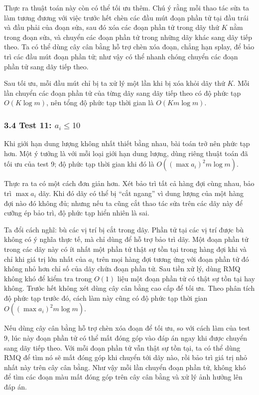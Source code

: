 \documentclass[11pt]{article}
\begin{document}
Thực ra thuật toán này còn có thể tối ưu thêm. Chú ý rằng mỗi thao tác sửa ta
làm tương đương với việc trước hết chèn các đầu mút đoạn phần tử tại đầu trái và
đầu phải của đoạn sửa, sau đó xóa các đoạn phần tử trong dãy thứ \(K\) nằm trong
đoạn sửa, và chuyển các đoạn phần tử trong những dãy khác sang dãy tiếp theo. Ta
có thể dùng cây cân bằng hỗ trợ chèn xóa đoạn, chẳng hạn splay, để bảo trì các
đầu mút đoạn phần tử; như vậy có thể nhanh chóng chuyển các đoạn phần tử sang
dãy tiếp theo.

Sau tối ưu, mỗi đầu mút chỉ bị ta xử lý một lần khi bị xóa khỏi dãy thứ \(K\).
Mỗi lần chuyển các đoạn phần tử của từng dãy sang dãy tiếp theo có độ phức tạp
\(O(K\log m)\), nên tổng độ phức tạp thời gian là \(O(Km\log m)\).

\subsubsection*{3.4 Test 11: \(a_i\le 10\)}

Khi giới hạn dung lượng không nhất thiết bằng nhau, bài toán trở nên phức tạp
hơn. Một ý tưởng là với mỗi loại giới hạn dung lượng, dùng riêng thuật toán đã
tối ưu của test 9; độ phức tạp thời gian khi đó là
\(O((\max a_i)^2m\log m)\).

Thực ra ta có một cách đơn giản hơn. Xét bảo trì tất cả hàng đợi cùng nhau, bảo
trì \(\max a_i\) dãy. Khi đó dãy có thể bị ``cắt ngang'' vì dung lượng của một
hàng đợi nào đó không đủ; nhưng nếu ta cũng cắt thao tác sửa trên các dãy này để
cưỡng ép bảo trì, độ phức tạp hiển nhiên là sai.

Ta đổi cách nghĩ: bù các vị trí bị cắt trong dãy. Phần tử tại các vị trí được bù
không có ý nghĩa thực tế, mà chỉ dùng để hỗ trợ bảo trì dãy. Một đoạn phần tử
trong các dãy này có ít nhất một phần tử thật sự tồn tại trong hàng đợi khi và
chỉ khi giá trị lớn nhất của \(a_i\) trên mọi hàng đợi tương ứng với đoạn phần
tử đó không nhỏ hơn chỉ số của dãy chứa đoạn phần tử. Sau tiền xử lý, dùng RMQ
không khó để kiểm tra trong \(O(1)\) liệu một đoạn phần tử có thật sự tồn tại
hay không. Trước hết không xét dùng cây cân bằng cao cấp để tối ưu. Theo phân
tích độ phức tạp trước đó, cách làm này cũng có độ phức tạp thời gian
\(O((\max a_i)^2m\log m)\).

Nếu dùng cây cân bằng hỗ trợ chèn xóa đoạn để tối ưu, so với cách làm của test
9, lúc này đoạn phần tử có thể mất đóng góp vào đáp án ngay khi được chuyển sang
dãy tiếp theo. Với mỗi đoạn phần tử vẫn thật sự tồn tại, ta có thể dùng RMQ để
tìm nó sẽ mất đóng góp khi chuyển tới dãy nào, rồi bảo trì giá trị nhỏ nhất này
trên cây cân bằng. Như vậy mỗi lần chuyển đoạn phần tử, không khó để tìm các
đoạn màu mất đóng góp trên cây cân bằng và xử lý ảnh hưởng lên đáp án.
\end{document}
